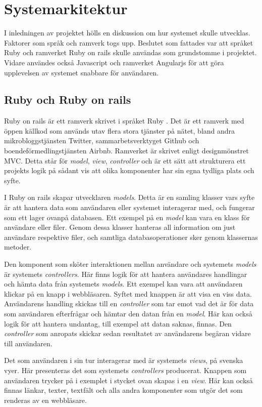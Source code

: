 \documentclass[a4paper,12pt,oneside,final]{extbook}
\begin{document}
\section{Systemarkitektur}
I inledningen av projektet hölls en diskussion om hur systemet skulle utvecklas. Faktorer som språk och ramverk togs upp. Beslutet som fattades var att språket Ruby och ramverket Ruby on rails skulle användas som grundstomme i projektet. Vidare användes också Javascript och ramverket Angularjs för att göra upplevelsen av systemet snabbare för användaren.

\subsection{Ruby och Ruby on rails}
Ruby on rails är ett ramverk skrivet i språket Ruby \cite{rubylang}. Det är ett ramverk med öppen källkod som används utav flera stora tjänster på nätet, bland andra mikrobloggstjänsten Twitter, sammarbetsverktyget Github och boendeförmedlingstjänsten Airbnb. Ramverket är skrivet enligt designmönstret MVC. Detta står för \textit{model}, \textit{view}, \textit{controller} och är ett sätt att strukturera ett projekts logik på sådant vis att olika komponenter har sin egna tydliga plats och syfte.

I Ruby on rails skapar utvecklaren \textit{models}. Detta är en samling klasser vars syfte är att hantera data som användaren eller systemet interagerar med, och fungerar som ett lager ovanpå databasen. Ett exempel på en \textit{model} kan vara en klass för användare eller filer. Genom dessa klasser hanteras all information om just användare respektive filer, och samtliga databasoperationer sker genom klassernas metoder.

Den komponent som sköter interaktionen mellan användare och systemets \textit{models} är systemets \textit{controllers}. Här finns logik för att hantera användares handlingar och hämta data från systemets \textit{models}. Ett exempel kan vara att användaren klickar på en knapp i webbläsaren. Syftet med knappen är att visa en viss data. Användarens handling skickas till en \textit{controller} som tar emot vad det är för data som användaren efterfrågar och hämtar den datan från en \textit{model}. Här kan också logik för att hantera undantag, till exempel att datan saknas, finnas. Den \textit{controller} som anropats skickar sedan resultatet av användarens begäran vidare till användaren.

Det som användaren i sin tur interagerar med är systemets \textit{views}, på svenska vyer. Här presenteras det som systemets \textit{controllers} producerat. Knappen som användaren trycker på i exemplet i stycket ovan skapas i en \textit{view}. Här kan också finnas länkar, texter, textfält och alla andra komponenter som utgör det som renderas av en webbläsare.
\end{document}
